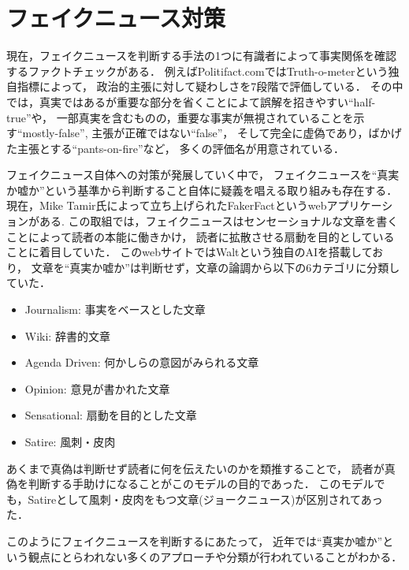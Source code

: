 \section{フェイクニュース対策}
現在，フェイクニュースを判断する手法の1つに有識者によって事実関係を確認するファクトチェックがある．
例えばPolitifact.comではTruth-o-meterという独自指標によって，
政治的主張に対して疑わしさを7段階で評価\cite{holan_2018}している．
その中では，真実ではあるが重要な部分を省くことによて誤解を招きやすい``half-true''や，
一部真実を含むものの，重要な事実が無視されていることを示す``mostly-false'',
主張が正確ではない``false''，
そして完全に虚偽であり，ばかげた主張とする``pants-on-fire''など，
多くの評価名が用意されている．

フェイクニュース自体への対策が発展していく中で，
フェイクニュースを``真実か嘘か''という基準から判断すること自体に疑義を唱える取り組みも存在する．
現在，Mike Tamir氏によって立ち上げられたFakerFactというwebアプリケーションがある\cite{tamir}.
この取組では，フェイクニュースはセンセーショナルな文章を書くことによって読者の本能に働きかけ，
読者に拡散させる扇動を目的としていることに着目していた．
このwebサイトではWaltという独自のAIを搭載しており，
文章を``真実か嘘か''は判断せず，文章の論調から以下の6カテゴリに分類していた．

\begin{itemize}
    \item Journalism: 事実をベースとした文章
    \item Wiki: 辞書的文章
    \item Agenda Driven: 何かしらの意図がみられる文章
    \item Opinion: 意見が書かれた文章
    \item Sensational: 扇動を目的とした文章
    \item Satire: 風刺・皮肉
\end{itemize}

あくまで真偽は判断せず読者に何を伝えたいのかを類推することで，
読者が真偽を判断する手助けになることがこのモデルの目的であった．
このモデルでも，Satireとして風刺・皮肉をもつ文章(ジョークニュース)が区別されてあった．

このようにフェイクニュースを判断するにあたって，
近年では``真実か嘘か''という観点にとらわれない多くのアプローチや分類が行われていることがわかる．
